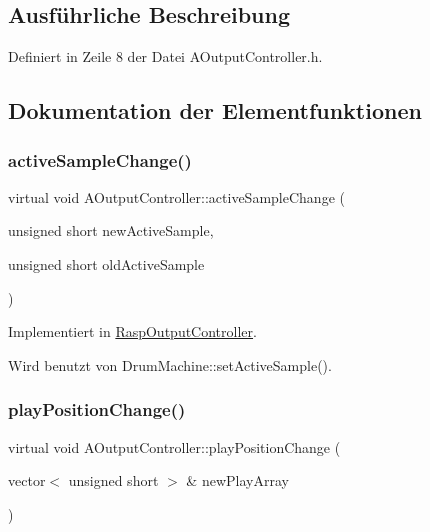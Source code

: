 \subsection{Ausführliche Beschreibung}


Definiert in Zeile 8 der Datei A\+Output\+Controller.\+h.



\subsection{Dokumentation der Elementfunktionen}
\mbox{\label{class_a_output_controller_ac2b87aa6291c38cc65185bf6a37ae300}} 
\subsubsection{\texorpdfstring{active\+Sample\+Change()}{activeSampleChange()}}
{\footnotesize\ttfamily virtual void A\+Output\+Controller\+::active\+Sample\+Change (\begin{DoxyParamCaption}\item[{unsigned short}]{new\+Active\+Sample,  }\item[{unsigned short}]{old\+Active\+Sample }\end{DoxyParamCaption})\hspace{0.3cm}{\ttfamily [pure virtual]}}



Implementiert in \hyperlink{class_rasp_output_controller_a92954cf26d4dd5f7d8835d1d508302c0}{Rasp\+Output\+Controller}.



Wird benutzt von Drum\+Machine\+::set\+Active\+Sample().

\mbox{\label{class_a_output_controller_a7bad658dfc3eb1223ace0c0454130818}} 
\subsubsection{\texorpdfstring{play\+Position\+Change()}{playPositionChange()}\hspace{0.1cm}{\footnotesize\ttfamily [1/2]}}
{\footnotesize\ttfamily virtual void A\+Output\+Controller\+::play\+Position\+Change (\begin{DoxyParamCaption}\item[{vector$<$ unsigned short $>$ \&}]{new\+Play\+Array }\end{DoxyParamCaption})\hspace{0.3cm}{\ttfamily [pure virtual]}}



